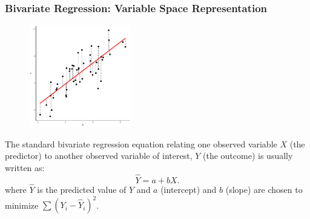 \documentclass{beamer}
\begin{document}
\begin{frame}
  \frametitle{Bivariate Regression: Variable Space Representation}

\begin{figure}
{\centering \includegraphics[height=1.75in]{bivariate-regression-image.pdf}}
\end{figure}

\smallskip

The standard bivariate regression equation relating one observed variable $X$ (the predictor) to another observed variable of interest, $Y$ (the outcome) is usually written as:
\[
\widehat{Y} = a + bX.
\]
where $\widehat{Y}$ is the predicted value of $Y$ and $a$ (intercept) and $b$ (slope) are  chosen to minimize $\sum (Y_i - \hat{Y}_i)^2$.


\end{frame}
\end{document}
